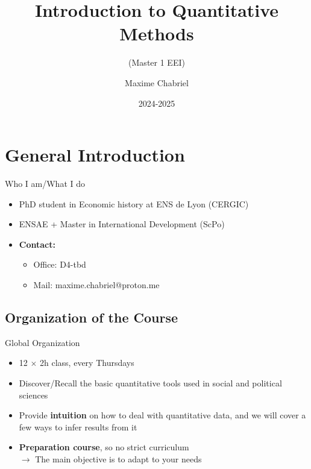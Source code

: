 \documentclass{beamer}
\title{Introduction to Quantitative Methods}
\subtitle{(Master 1 EEI)}
\author{Maxime Chabriel}
\date{2024-2025}
\begin{document}
\maketitle

\section{General Introduction}
\begin{frame}{Who I am/What I do}
    \begin{itemize}
        \item PhD student in Economic history at ENS de Lyon (CERGIC)
        \vspace{0.4cm}
        \item ENSAE + Master in International Development (ScPo)
        \vspace{0.4cm}
        \item \textbf{Contact:}
        \vspace{0.2cm}
        \begin{itemize}
            \item Office: D4-tbd
        \vspace{0.2cm}
            \item Mail: maxime.chabriel@proton.me
        \end{itemize}
    \end{itemize}
\end{frame}


\subsection{Organization of the Course}
\begin{frame}{Global Organization}
    \begin{itemize}
        \item 12 $\times$ 2h class, every Thursdays
        \vspace{0.3cm}
        \item Discover/Recall the basic quantitative tools used in social and political sciences
        \vspace{0.3cm}
        \item Provide \textbf{intuition} on how to deal with quantitative data, and we will cover a few ways to infer results from it
        \vspace{0.3cm}
        \item \textbf{Preparation course}, so no strict curriculum
        \\ $\rightarrow$ The main objective is to adapt to your needs
    \end{itemize}
\end{frame}
\end{document}

